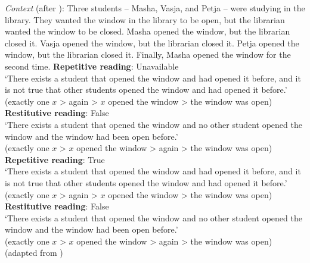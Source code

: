 \documentclass[output=paper]{langscibook}
\begin{document}
 \ea\label{ex:bondarenko:19}
\textit{Context} (after \citealt{Lechner-etal2015}): Three students -- Masha, Vasja, and Petja -- were studying in the library. They wanted the window in the library to be open, but the librarian wanted the window to be closed. Masha opened the window, but the librarian closed it. Vasja opened the window, but the librarian closed it. Petja opened the window, but the librarian closed it. Finally, Masha opened the window for the second time.
\ea \textbf{Repetitive reading}: Unavailable\\
`There exists a student that opened the window and had opened it before, and it is not true that other students opened the window and had opened it before.'\\\hfill{\small (exactly one $x$ > again > $x$ opened the window > the window was open)}
\ex \textbf{Restitutive reading}: False\\
`There exists a student that opened the window and no other student opened the window and the window had been open before.'\\\hfill {\small (exactly one $x$ > $x$ opened the window > again > the window was open)}
\z
{}\label{ex:bondarenko:19b}
\ea \textbf{Repetitive reading}: True\label{ex:bondarenko:19c}\\
`There exists a student that opened the window and had opened it before, and it is not true that other students opened the window and had opened it before.'\\\hfill{\small (exactly one $x$ > again > $x$ opened the window > the window was open)}
\ex \textbf{Restitutive reading}: False\label{ex:bondarenko:19d}\\
`There exists a student that opened the window and no other student opened the window and the window had been open before.'\\\hfill {\small (exactly one $x$ > $x$ opened the window > again > the window was open)}\\
\hfill (adapted from \citealt[31]{Tatevosov2016})
\z
\z\z
\end{document}
